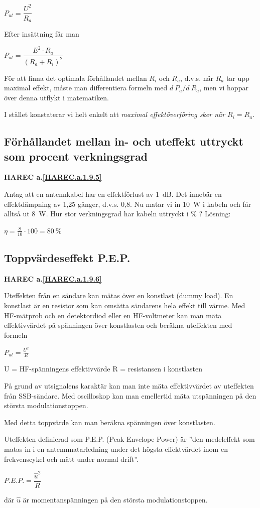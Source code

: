 \(P_{ut} = \dfrac{U^2}{R_a}\)

Efter insättning får man

\(P_{ut} = \dfrac{E^2 \cdot R_a}{(R_a + R_i)^2}\)

För att finna det optimala förhållandet mellan \(R_i\) och \(R_a\), d.v.s. när
\(R_a\) tar upp maximal effekt, måste man differentiera formeln med \(d\ P_a/d\ R_a\), men vi hoppar över denna utflykt i matematiken.

I stället konstaterar vi helt enkelt att \emph{maximal effektöverföring sker när
\(R_i = R_a\)}.

\subsection{Förhållandet mellan in- och uteffekt uttryckt som procent verkningsgrad}
\textbf{HAREC a.\ref{HAREC.a.1.9.5}\label{myHAREC.a.1.9.5}}

Antag att en antennkabel har en effektförlust av 1~dB. Det innebär en
effektdämpning av 1,25 gånger, d.v.s. 0,8. Nu matar vi in 10~W i kabeln och får
alltså ut 8~W. Hur stor verkningsgrad har kabeln uttryckt i \% ?
Lösning:

\(\eta = \frac{8}{10} \cdot 100 = 80\ \%\)

\subsection{Toppvärdeseffekt P.E.P.}
\textbf{HAREC a.\ref{HAREC.a.1.9.6}\label{myHAREC.a.1.9.6}}

Uteffekten från en sändare kan mätas över en konstlast (dummy load). En
konstlast är en resistor som kan omsätta sändarens hela effekt till värme. Med
HF-mätprob och en detektordiod eller en HF-voltmeter kan man mäta
effektivvärdet på spänningen över konstlasten och beräkna uteffekten med
formeln

\(P_{ut} = \frac{U^2}{R}\)

U = HF-spänningens effektivvärde
R = resistansen i konstlasten

På grund av utsignalens karaktär kan man inte mäta effektivvärdet av uteffekten
från SSB-sändare. Med oscilloskop kan man emellertid mäta utspänningen på den
största modulationstoppen.

Med detta toppvärde kan man beräkna spänningen över konstlasten.

Uteffekten definierad som P.E.P. (Peak Envelope Power) är ''den medeleffekt som
matas in i en antennmatarledning under det högsta effektvärdet inom en
frekvenscykel och mätt under normal drift''.

\(P.E.P. = \dfrac{\hat{u}^2}{R}\)

där \(\hat{u}\) är momentanspänningen på den största modulationstoppen.
